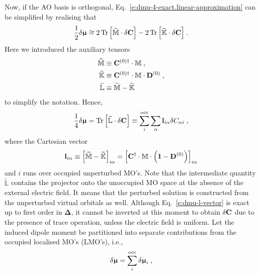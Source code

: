 \documentclass[aip,amsmath,amssymb,reprint,floatfix]{revtex4-1}
\newcommand{\BM}[1]{\bm{#1}}
\DeclareMathOperator{\Tr}{Tr}
\begin{document}
Now, if the AO basis is orthogonal, Eq.~\eqref{e:dmu-4-exact.linear-approximation} can be simplified by realising that
%
\begin{equation}
 \frac{1}{2} 
 \delta {\BM{\upmu}}
  \cong
2 \Tr{ 
    \left[ 
         \widetilde{\mathbb{M}} \cdot \delta {\bf C}
   \right] }  
-
2 \Tr{ 
    \left[ 
         \widetilde{\mathbb{K}} \cdot \delta {\bf C}
   \right] } \;.
\end{equation}
%
Here we introduced the auxiliary tensors
%
\begin{subequations}
 \begin{align}
   \widetilde{\mathbb{M}}  &\equiv {\bf C}^{(0)\dagger} \cdot {\mathbb{M}}     \;,           \\
   \widetilde{\mathbb{K}}  &\equiv {\bf C}^{(0)\dagger} \cdot {\mathbb{M}} \cdot {\bf D}^{(0)} \;, \\
   \widetilde{\mathbb{L}}  &\equiv \widetilde{\mathbb{M}} - \widetilde{\mathbb{K}} \;
 \end{align}
\end{subequations}
%
to simplify the notation. Hence,
%
\begin{equation} \label{e:dmu-l-vector}
  \frac{1}{4} 
 \delta {\BM{\upmu}} %
   =
   \Tr{ 
    \left[ 
         \widetilde{\mathbb{L}} \cdot \delta {\bf C}
    \right] }
   \equiv \sum_{i}^{\rm occ} \sum_\alpha {\bf l}_{i\alpha} \delta C_{\alpha i} \;,
\end{equation}
%
where the Cartesian vector
%
\begin{equation}\label{e:l-vector}
 {\bf l}_{i\alpha} \equiv \left[ \widetilde{\mathbb{M}} - \widetilde{\mathbb{K}} \right]_{i\alpha} 
      = \left[  {\bf C}^\dagger \cdot \mathbb{M} \cdot \left( {\bf 1} - {\bf D}^{(0)} \right) \right]_{i\alpha}
\end{equation}
%
and $i$ runs over occupied unperturbed MO's.
Note that the intermediate quantity $\widetilde{\mathbb{L}}$ contains the projector onto
the unoccupied MO space at the absence of the external electric field. It means that the
perturbed solution is constructed from the unperturbed virtual orbitals as well.
Although Eq.~\eqref{e:dmu-l-vector}
is exact up to first order in ${\BM\Delta}$, it cannot be inverted at this moment to obtain $\delta {\bf C}$
due to the presence of trace operation, unless the electric field is uniform.
Let the induced dipole moment be partitioned into separate contributions
from the occupied localised MO's (LMO's), i.e.,
%
\begin{equation} \label{e:dmu-part}
 \delta {\BM{\upmu}} = \sum_i^{\rm occ} \delta {\BM{\upmu}}_i \;,
\end{equation}
\end{document}
